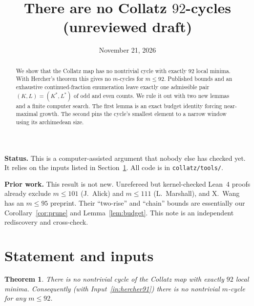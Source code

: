 \documentclass[11pt]{amsart}
\title[No Collatz 92-cycles (draft)]{There are no Collatz $92$-cycles\\[2pt] \normalsize (unreviewed draft)}
\date{November 21, 2026}
\newtheorem{theorem}{Theorem}[section]
\theoremstyle{definition}
\theoremstyle{remark}
\newcommand{\Kst}{K^{*}}
\newcommand{\Lst}{L^{*}}
\begin{document}
\begin{abstract}
We show that the Collatz map has no nontrivial cycle with exactly $92$ local minima.
With Hercher's theorem this gives no $m$-cycles for $m \le 92$. Published bounds and an
exhaustive continued-fraction enumeration leave exactly one admissible pair
$(K, L) = (\Kst, \Lst)$ of odd and even counts. We rule it out with two new lemmas and
a finite computer search. The first lemma is an exact budget identity forcing near-maximal
growth. The second pins the cycle's smallest element to a narrow window using its
archimedean size.
\end{abstract}

\maketitle

\noindent\textbf{Status.} This is a computer-assisted argument that nobody else has checked
yet. It relies on the inputs listed in Section~\ref{sec:statement}. All code is in
\texttt{collatz/tools/}.

\noindent\textbf{Prior work.} This result is not new. Unrefereed but kernel-checked Lean~4 proofs
already exclude $m \le 101$ (J.~Alick) and $m \le 111$ (L.~Marshall), and X.~Wang has an $m \le 95$
preprint. Their ``two-rise'' and ``chain'' bounds are essentially our Corollary~\ref{cor:prune} and
Lemma~\ref{lem:budget}. This note is an independent rediscovery and cross-check.

\section{Statement and inputs}\label{sec:statement}

\begin{theorem}\label{thm:main}
There is no nontrivial cycle of the Collatz map with exactly $92$ local minima. Consequently
(with Input~\ref{in:hercher91}) there is no nontrivial $m$-cycle for any $m \le 92$.
\end{theorem}
\end{document}

